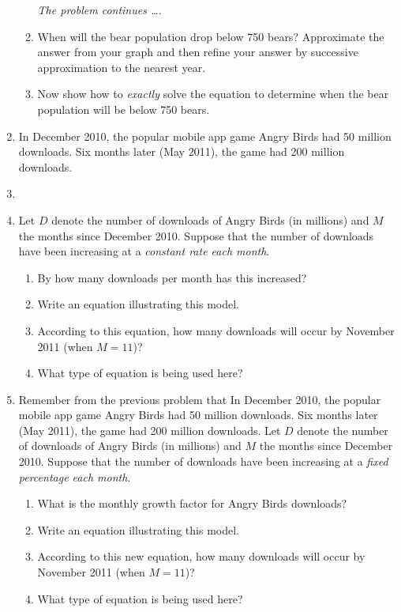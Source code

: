 \documentclass[12pt]{article}
\begin{document}
\begin{enumerate}
\begin{enumerate}
\newpage
\hspace{-.5 in}\emph{The problem continues \ldots.}

\item When will the bear population drop below 750 bears?  Approximate the answer from your graph and then refine your answer by successive approximation to the nearest year.
\vfill
\item Now show how to \textit{exactly} solve the equation to determine when the bear population will be below 750 bears.
\vfill
\end{enumerate}


\newpage
\item In December 2010, the popular mobile app game Angry Birds had 50 million downloads.  Six months later (May 2011), the game had 200 million downloads.  
\item[]
\item[] Let $D$ denote the number of downloads of Angry Birds (in millions) and $M$ the months since December 2010.  Suppose that the number of downloads have been increasing at a \textit{constant rate each month}.

\begin{enumerate}
\item By how many downloads per month has this increased?
\vfill
\item Write an equation illustrating this model.
\vfill
\item According to this equation, how many downloads will occur by November 2011 (when $M=11$)?
\vfill
\item What type of equation is being used here?
\vfill
\end{enumerate}

\newpage

\item  Remember from the previous problem that In December 2010, the popular mobile app game Angry Birds had 50 million downloads.  Six months later (May 2011), the game had 200 million downloads. Let $D$ denote the number of downloads of Angry Birds (in millions) and $M$ the months since December 2010.  Suppose that the number of downloads have been increasing at a \textit{fixed percentage each month}.

\begin{enumerate}
\item What is the monthly growth factor for Angry Birds downloads?  
\vfill
\item Write an equation illustrating this model.
\vfill
\item According to this new equation, how many downloads will occur by November 2011 (when $M=11$)?
\vfill
\item What type of equation is being used here?
\vfill
\end{enumerate}




\end{enumerate}
\end{document}
